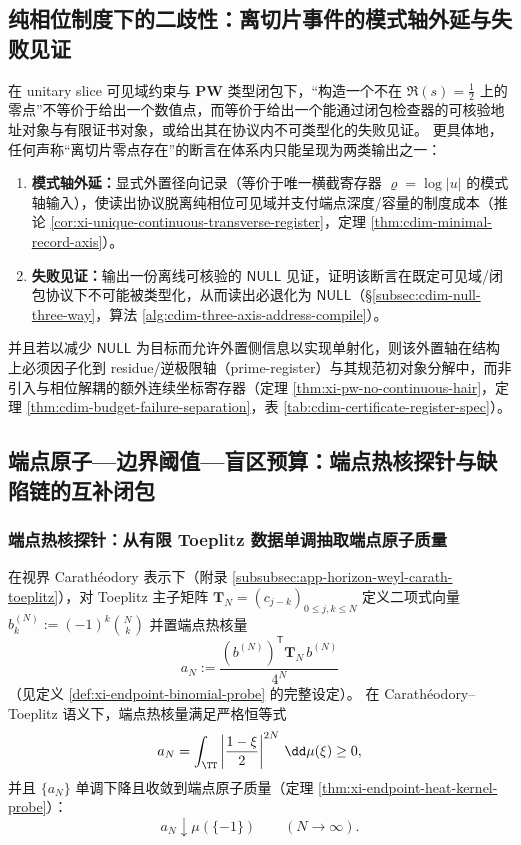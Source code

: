 \subsection{纯相位制度下的二歧性：离切片事件的模式轴外延与失败见证}\label{subsec:cdim-offline-zero-claim-interface}
在 unitary slice 可见域约束与 \(\mathbf{PW}\) 类型闭包下，“构造一个不在 \(\Re(s)=\tfrac12\) 上的零点”不等价于给出一个数值点，而等价于给出一个能通过闭包检查器的可核验地址对象与有限证书对象，或给出其在协议内不可类型化的失败见证。
更具体地，任何声称“离切片零点存在”的断言在体系内只能呈现为两类输出之一：
\begin{enumerate}
  \item \textbf{模式轴外延：}显式外置径向记录（等价于唯一横截寄存器 \(\varrho=\log|u|\) 的模式轴输入），使读出协议脱离纯相位可见域并支付端点深度/容量的制度成本（推论 \ref{cor:xi-unique-continuous-transverse-register}，定理 \ref{thm:cdim-minimal-record-axis}）。
  \item \textbf{失败见证：}输出一份离线可核验的 \(\mathsf{NULL}\) 见证，证明该断言在既定可见域/闭包协议下不可能被类型化，从而读出必退化为 \(\mathsf{NULL}\)（\S\ref{subsec:cdim-null-three-way}，算法 \ref{alg:cdim-three-axis-address-compile}）。
\end{enumerate}
并且若以减少 \(\mathsf{NULL}\) 为目标而允许外置侧信息以实现单射化，则该外置轴在结构上必须因子化到 residue/逆极限轴（prime-register）与其规范初对象分解中，而非引入与相位解耦的额外连续坐标寄存器（定理 \ref{thm:xi-pw-no-continuous-hair}，定理 \ref{thm:cdim-budget-failure-separation}，表 \ref{tab:cdim-certificate-register-spec}）。

\subsection{端点原子—边界阈值—盲区预算：端点热核探针与缺陷链的互补闭包}\label{subsec:cdim-endpoint-heat-kernel-probe}
\subsubsection{端点热核探针：从有限 Toeplitz 数据单调抽取端点原子质量}
在视界 Carath\'eodory 表示下（附录 \ref{subsubsec:app-horizon-weyl-carath-toeplitz}），对 Toeplitz 主子矩阵 \(\mathbf{T}_N=(c_{j-k})_{0\le j,k\le N}\) 定义二项式向量
\(
b^{(N)}_k:=(-1)^k\binom{N}{k}
\)
并置端点热核量
\[
\boxed{\;
a_N:=\frac{(b^{(N)})^{\mathsf T}\mathbf{T}_N\,b^{(N)}}{4^N}\;}
\]
（见定义 \ref{def:xi-endpoint-binomial-probe} 的完整设定）。
在 Carath\'eodory--Toeplitz 语义下，端点热核量满足严格恒等式
\[
a_N=\int_{\TT}\left|\frac{1-\xi}{2}\right|^{2N}\,\dd\mu(\xi)\ge 0,
\]
并且 \(\{a_N\}\) 单调下降且收敛到端点原子质量（定理 \ref{thm:xi-endpoint-heat-kernel-probe}）：
\[
a_N\downarrow \mu(\{-1\})\qquad(N\to\infty).
\]


